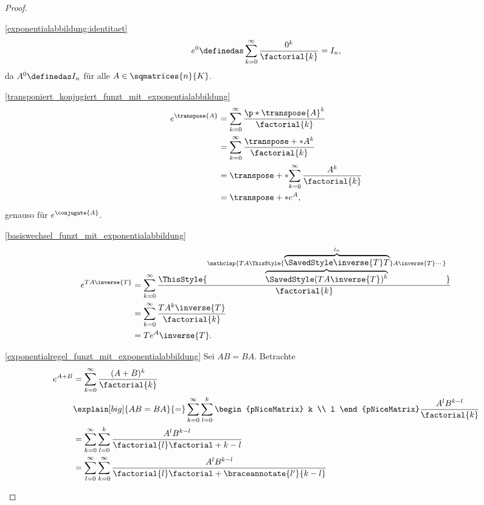 \begin{proof}
  \begin{proofdescription}
    \item[\ref{exponentialabbildung:identitaet}] \begin{equation*}
      e^0\definedas \sum_{k=0}^{\infty}\frac{0^k}{\factorial{k}}=I_n,
    \end{equation*}
    da \( A^0\definedas I_n \) für alle \( A\in \sqmatrices{n}{K} \).
    \item[\ref{transponiert_konjugiert_funzt_mit_exponentialabbildung}]
    \begin{align*}
      e^{\transpose{A}}&=\sum_{k=0}^{\infty}\frac{\p*{\transpose{A}}^k}{\factorial{k}}\\
      &=\sum_{k=0}^{\infty}\frac{\transpose+*{A^k}}{\factorial{k}}\\
      &=\transpose+*{\sum_{k=0}^{\infty}\frac{A^k}{\factorial{k}}}\\
      &=\transpose+*{e^A},
    \end{align*}
    genauso für \( e^{\conjugate{A}} \).
    \item[\ref{basiswechsel_funzt_mit_exponentialabbildung}]
    \begin{align*}
      e^{TA\inverse{T}}&=\sum_{k=0}^{\infty}\frac{\ThisStyle{\overbrace{\SavedStyle(TA\inverse{T})^k}^{\mathclap{TA\ThisStyle{\overbrace{\SavedStyle\inverse{T}T}^{I_n}}A\inverse{T}\dotsm}}}}{\factorial{k}}\\
      &=\sum_{k=0}^{\infty}\frac{T A^k \inverse{T}}{\factorial{k}}\\
      &=Te^A \inverse{T}.
    \end{align*}
    \item[\ref{exponentialregel_funzt_mit_exponentialabbildung}] Sei \( AB=BA \). Betrachte
    \begin{align*}
      e^{A+B}&=\sum_{k=0}^{\infty}\frac{(A+B)^k}{\factorial{k}}\\
      &\explain[big]{AB=BA}{=}\sum_{k=0}^{\infty}\sum_{l=0}^{k}\begin{pNiceMatrix} k \\ l \end{pNiceMatrix}\frac{A^l B^{k-l}}{\factorial{k}}\\
      &=\sum_{k=0}^{\infty}\sum_{l=0}^{k}\frac{A^l B^{k-l}}{\factorial{l}\factorial+{k-l}}\\
      &=\sum_{l=0}^{\infty}\sum_{k=0}^{\infty}\frac{A^l B^{k-l}}{\factorial{l}\factorial+{\braceannotate{l'}{k-l}}}\\

\end{align*}
\end{proofdescription}
\end{proof}
